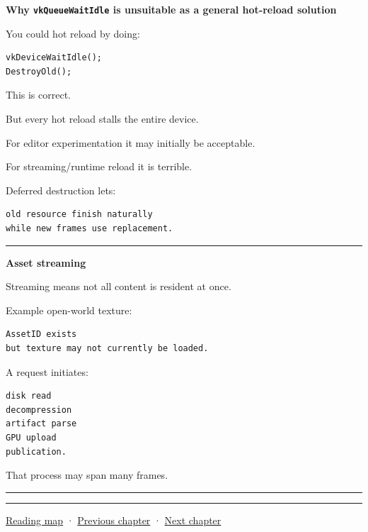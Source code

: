\textbf{Why \texttt{vkQueueWaitIdle} is unsuitable as a general hot-reload solution}

You could hot reload by doing:

\begin{verbatim}
vkDeviceWaitIdle();
DestroyOld();
\end{verbatim}

This is correct.

But every hot reload stalls the entire device.

For editor experimentation it may initially be acceptable.

For streaming/runtime reload it is terrible.

Deferred destruction lets:

\begin{verbatim}
old resource finish naturally
while new frames use replacement.
\end{verbatim}

\begin{center}\rule{0.5\linewidth}{0.5pt}\end{center}

\textbf{Asset streaming}

Streaming means not all content is resident at once.

Example open-world texture:

\begin{verbatim}
AssetID exists
but texture may not currently be loaded.
\end{verbatim}

A request initiates:

\begin{verbatim}
disk read
decompression
artifact parse
GPU upload
publication.
\end{verbatim}

That process may span many frames.

\begin{center}\rule{0.5\linewidth}{0.5pt}\end{center}

\begin{center}\rule{0.5\linewidth}{0.5pt}\end{center}

\hyperref[volume-reading-map]{Reading map} · \hyperref[05-engine-i-ch009-player-choices-rules-and-readable-feedback]{Previous chapter} · \hyperref[05-engine-i-ch011-streaming-resources-through-explicit-states]{Next chapter}
